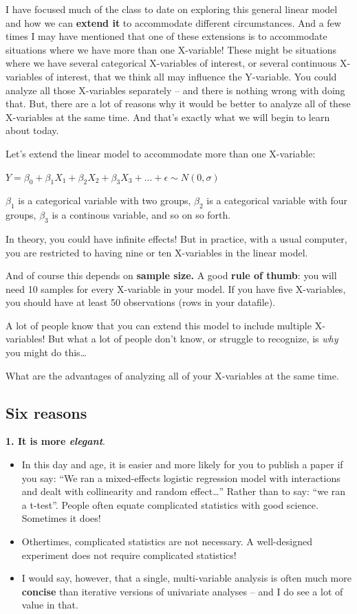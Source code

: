 \documentclass[
]{article}
\providecommand{\tightlist}{%
  \setlength{\itemsep}{0pt}\setlength{\parskip}{0pt}}
\begin{document}
I have focused much of the class to date on exploring this general
linear model and how we can \textbf{extend it} to accommodate different
circumstances. And a few times I may have mentioned that one of these
extensions is to accommodate situations where we have more than one
X-variable! These might be situations where we have several categorical
X-variables of interest, or several continuous X-variables of interest,
that we think all may influence the Y-variable. You could analyze all
those X-variables separately -- and there is nothing wrong with doing
that. But, there are a lot of reasons why it would be better to analyze
all of these X-variables at the same time. And that's exactly what we
will begin to learn about today.

Let's extend the linear model to accommodate more than one X-variable:

\textbf{\(Y = \beta_0 + \beta_1 X_1 + \beta_2 X_2 + \beta_3 X_3 + ... +\epsilon \sim N(0, \sigma)\)}

\(\beta_1\) is a categorical variable with two groups, \(\beta_2\) is a
categorical variable with four groups, \(\beta_3\) is a continous
variable, and so on so forth.

In theory, you could have infinite effects! But in practice, with a
usual computer, you are restricted to having nine or ten X-variables in
the linear model.

And of course this depends on \textbf{sample size.} A good \textbf{rule
of thumb}: you will need 10 samples for every X-variable in your model.
If you have five X-variables, you should have at least 50 observations
(rows in your datafile).

A lot of people know that you can extend this model to include multiple
X-variables! But what a lot of people don't know, or struggle to
recognize, is \emph{why} you might do this\ldots{}

What are the advantages of analyzing all of your X-variables at the same
time.

\subsection{Six reasons}\label{six-reasons}

\textbf{1. It is more \emph{elegant}}.

\begin{itemize}
\tightlist
\item
  In this day and age, it is easier and more likely for you to publish a
  paper if you say: ``We ran a mixed-effects logistic regression model
  with interactions and dealt with collinearity and random
  effect\ldots{}'' Rather than to say: ``we ran a t-test''. People often
  equate complicated statistics with good science. Sometimes it does!
\item
  Othertimes, complicated statistics are not necessary. A well-designed
  experiment does not require complicated statistics!
\item
  I would say, however, that a single, multi-variable analysis is often
  much more \textbf{concise} than iterative versions of univariate
  analyses -- and I do see a lot of value in that.
\end{itemize}
\end{document}

